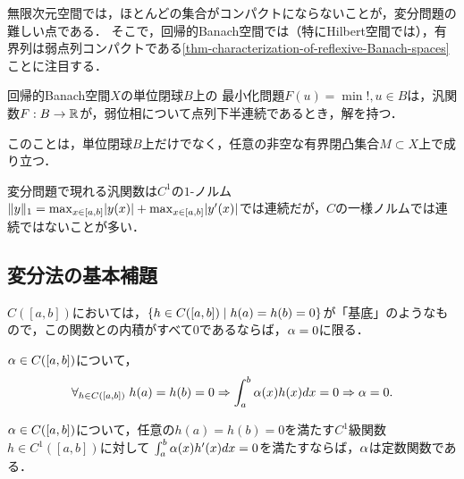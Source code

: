 \documentclass[uplatex,dvipdfmx]{jsreport}
\begin{document}
\begin{tcolorbox}[colframe=ForestGreen, colback=ForestGreen!10!white,breakable,colbacktitle=ForestGreen!40!white,coltitle=black,fonttitle=\bfseries\sffamily,
title=]
    無限次元空間では，ほとんどの集合がコンパクトにならないことが，変分問題の難しい点である．
    そこで，回帰的Banach空間では（特にHilbert空間では），有界列は弱点列コンパクトである\ref{thm-characterization-of-reflexive-Banach-spaces}ことに注目する．
\end{tcolorbox}

\begin{theorem}
    回帰的Banach空間$X$の単位閉球$B$上の
    最小化問題$F(u)=\min!,u\in B$は，汎関数$F:B\to\mathbb{R}$が，弱位相について点列下半連続であるとき，解を持つ．

    このことは，単位閉球$B$上だけでなく，任意の非空な有界閉凸集合$M\subset X$上で成り立つ．
\end{theorem}

\begin{remark}
    変分問題で現れる汎関数は$C^1$の$1$-ノルム$\|y\|_1=\max_{x\in[a,b]}\lvert y(x)\rvert+\max_{x\in[a,b]}\lvert y'(x)\rvert$では連続だが，$C$の一様ノルムでは連続ではないことが多い．
\end{remark}

\subsection{変分法の基本補題}

\begin{tcolorbox}[colframe=ForestGreen, colback=ForestGreen!10!white,breakable,colbacktitle=ForestGreen!40!white,coltitle=black,fonttitle=\bfseries\sffamily,
title=]
    $C([a,b])$においては，$\left\{h\in C([a,b])\mid h(a)=h(b)=0\right\}$が「基底」のようなもので，この関数との内積がすべて$0$であるならば，$\alpha=0$に限る．
\end{tcolorbox}

\begin{lemma}
    $\alpha\in C([a,b])$について，
    \[\forall_{h\in C([a,b])}\;h(a)=h(b)=0\Rightarrow\int^b_a\alpha(x)h(x)dx=0\Rightarrow\alpha=0.\]
\end{lemma}

\begin{lemma}
    $\alpha\in C([a,b])$について，任意の$h(a)=h(b)=0$を満たす$C^1$級関数$h\in C^1([a,b])$に対して
    $\int^b_a\alpha(x)h'(x)dx=0$を満たすならば，$\alpha$は定数関数である．
\end{lemma}
\end{document}
